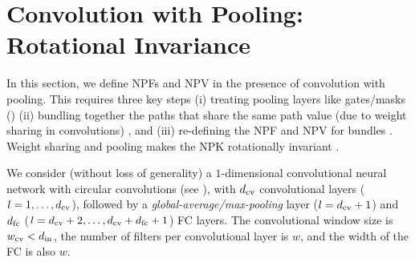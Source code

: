 \section{Convolution with Pooling: Rotational Invariance}

In this section, we define NPFs and NPV in the presence of convolution with pooling. This requires three key steps (i) treating pooling layers like gates/masks () (ii) bundling together the paths that share the same path value (due to weight sharing in convolutions) , and (iii) re-defining the NPF and NPV for bundles . Weight sharing and pooling makes the NPK rotationally invariant .

We consider (without loss of generality) a $1$-dimensional convolutional neural network with circular convolutions (see ), with $d_{\text{cv}}$ convolutional layers ($l=1,\ldots,d_{\text{cv}}$), followed by a \emph{global-average/max-pooling} layer ($l=d_{\text{cv}}+1$) and $d_{\text{fc}}$ ($l=d_{\text{cv}}+2,\ldots,d_{\text{cv}}+d_{\text{fc}}+1$) FC  layers. The convolutional window size is $w_{\text{cv}}<d_{\text{in}}$, the number of filters per convolutional layer is $w$, and the width of the FC is also $w$. 

